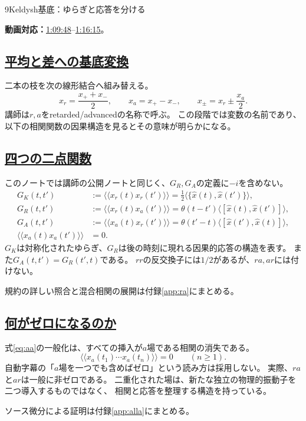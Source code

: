 \documentclass[a4paper,11pt]{ltjsarticle}
\newcommand{\subsectionlink}[1]{\subsection[#1]{\hyperlink{toc}{#1}}}
\numberwithin{equation}{section}
\newcommand{\av}[1]{\langle #1\rangle}
\newcommand{\pav}[1]{\langle\!\langle #1\rangle\!\rangle}
\newcommand{\video}[2]{\href{https://www.youtube.com/watch?v=RYxzcUhIHjk\&t=#1s}{#2}}
\newcommand{\videosource}[1]{\par\noindent\textcolor{noteblue}{\textbf{動画対応：}#1}\par\smallskip}
\begin{document}
\begin{lecturesection}{9}{Keldysh基底：ゆらぎと応答を分ける}
\label{sec:keldysh}
\videosource{\video{4188}{1:09:48}--\video{4575}{1:16:15}。}
\subsectionlink{平均と差への基底変換}
二本の枝を次の線形結合へ組み替える。
\begin{equation}
 x_r=\frac{x_++x_-}{2},\qquad x_a=x_+-x_-,\qquad
 x_\pm=x_r\pm\frac{x_a}{2}.
 \label{eq:ra}
\end{equation}
講師は$r,a$をretarded/advancedの名称で呼ぶ。
この段階では変数の名前であり、以下の相関関数の因果構造を見るとその意味が明らかになる。

\subsectionlink{四つの二点関数}
このノートでは講師の公開ノートと同じく、$G_R,G_A$の定義に$-i$を含めない。
\begin{align}
 G_K(t,t')&:=\pav{x_r(t)x_r(t')}
       =\frac12\av{\{\hat x(t),\hat x(t')\}},\label{eq:GK}\\
 G_R(t,t')&:=\pav{x_r(t)x_a(t')}
       =\theta(t-t')\av{[\hat x(t),\hat x(t')]},\label{eq:GR}\\
 G_A(t,t')&:=\pav{x_a(t)x_r(t')}
       =\theta(t'-t)\av{[\hat x(t'),\hat x(t)]},\label{eq:GA}\\
 \pav{x_a(t)x_a(t')}&=0.\label{eq:aa}
\end{align}
$G_K$は対称化されたゆらぎ、$G_R$は後の時刻に現れる因果的応答の構造を表す。
また$G_A(t,t')=G_R(t',t)$である。
$rr$の反交換子には$1/2$があるが、$ra,ar$には付けない。

\par\noindent 規約の詳しい照合と混合相関の展開は付録\ref{app:ra}にまとめる。

\subsectionlink{何がゼロになるのか}
式\eqref{eq:aa}の一般化は、すべての挿入が$a$場である相関の消失である。
\begin{equation}
 \pav{x_a(t_1)\cdots x_a(t_n)}=0\qquad(n\ge1).
 \label{eq:alla}
\end{equation}
自動字幕の「$a$場を一つでも含めばゼロ」という読み方は採用しない。
実際、$ra$と$ar$は一般に非ゼロである。
二重化された場は、新たな独立の物理的振動子を二つ導入するものではなく、
相関と応答を整理する構造を持っている。

\par\noindent ソース微分による証明は付録\ref{app:alla}にまとめる。

\end{lecturesection}
\end{document}
